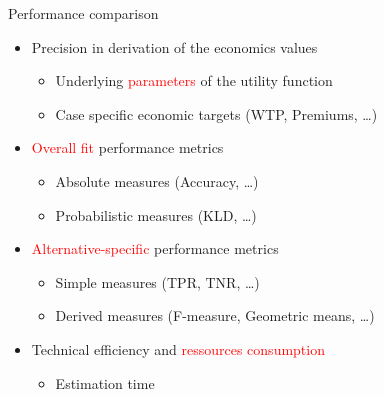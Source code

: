 \documentclass[11pt,ignorenonframetext,]{beamer}
\providecommand{\tightlist}{%
  \setlength{\itemsep}{0pt}\setlength{\parskip}{0pt}}
\begin{document}
\begin{frame}{Performance comparison}
\protect\hypertarget{performance-comparison}{}

\begin{itemize}
\tightlist
\item
  Precision in derivation of the economics values

  \begin{itemize}
  \tightlist
  \item
    Underlying \textcolor{red}{parameters} of the utility function
  \item
    Case specific economic targets (WTP, Premiums, \ldots{})
  \end{itemize}
\item
  \textcolor{red}{Overall fit} performance metrics

  \begin{itemize}
  \tightlist
  \item
    Absolute measures (Accuracy, \ldots{})
  \item
    Probabilistic measures (KLD, \ldots{})
  \end{itemize}
\item
  \textcolor{red}{Alternative-specific} performance metrics

  \begin{itemize}
  \tightlist
  \item
    Simple measures (TPR, TNR, \ldots{})
  \item
    Derived measures (F-measure, Geometric means, \ldots{})
  \end{itemize}
\item
  Technical efficiency and \textcolor{red}{ressources consumption}

  \begin{itemize}
  \tightlist
  \item
    Estimation time
  \end{itemize}
\end{itemize}

\end{frame}
\end{document}
